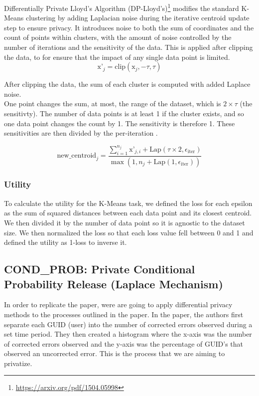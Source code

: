 \documentclass[12pt,letterpaper]{article}
\begin{document}
Differentially Private Lloyd's Algorithm (DP-Lloyd's)\footnote{\url{https://arxiv.org/pdf/1504.05998}} modifies the standard K-Means clustering by adding Laplacian noise during the iterative centroid update step to ensure privacy. It introduces noise to both the sum of coordinates and the count of points within clusters, with the amount of noise controlled by the number of iterations and the sensitivity of the data. This is applied after clipping the data, to for ensure that the impact of any single data point is limited. 
\[
\text{x'}_j = \text{clip}\left( \text{x}_j, -\tau, \tau \right)
\]

After clipping the data, the sum of each cluster is computed with added Laplace noise. \\One point changes the sum, at most, the range of the dataset, which is $2 \times \tau$ (the sensitivty). The number of data points is at least 1 if the cluster exists, and so one data point changes the count by 1. The sensitivity is therefore 1. These sensitivities are then divided by the per-iteration  \epsilon.

\[
\text{new\_centroid}_j=
\frac{
    \sum_{i=1}^{n_j} \text{x'}_{j,i} + \text{Lap}(\tau \times 2, \epsilon_{\text{iter}})
}{
    \max\left( 1, n_j + \text{Lap}(1, \epsilon_{\text{iter}}) \right)
}
\]

\subsubsection{Utility}
To calculate the utility for the K-Means task, we defined the loss for each
epsilon as the sum of squared distances between each data point and its closest centroid. We then divided it by the number of data point so it is agnostic to the dataset size. We then normalized the loss so that each loss value fell between 0 and 1 and defined the utility as
1-loss to inverse it.



\subsection{COND\_PROB: Private Conditional Probability Release (Laplace Mechanism)}
In order to replicate the paper, were are going to apply differential privacy methods to the processes outlined in the paper. In the paper, the authors first separate each GUID (user) into the number of corrected errors observed during a set time period. They then created a histogram where the x-axis was the number of corrected errors observed and the y-axis was the percentage of GUID's that observed an uncorrected error.\cite{Kwasnick2023} This is the process that we are aiming to privatize. 
\end{document}
